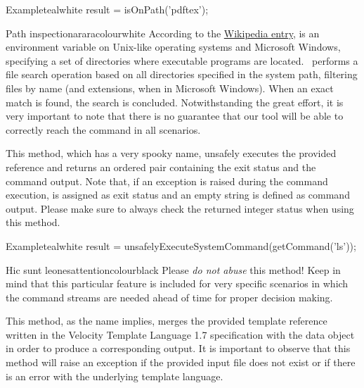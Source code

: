 \begin{description}
\begin{codebox}{Example}{teal}{\icnote}{white}
result = isOnPath('pdftex');
\end{codebox}

\begin{messagebox}{Path inspection}{araracolour}{\icok}{white}
According to the \href{https://en.wikipedia.org/wiki/PATH_(variable)}{Wikipedia entry},  is an environment variable on Unix-like operating systems and Microsoft Windows, specifying a set of directories where executable programs are located. \arara\ performs a file search operation based on all directories specified in the system path, filtering files by name (and extensions, when in Microsoft Windows). When an exact match is found, the search is concluded. Notwithstanding the great effort, it is very important to note that there is no guarantee that our tool will be able to correctly reach the command in all scenarios.
\end{messagebox}

\item[\mdbox{R}{unsafelyExecuteSystemCommand(Command command)}{Pair<Integer, String>}] This method, which has a very spooky name, unsafely executes the provided  reference and returns an ordered pair containing the exit status and the command output. Note that, if an exception is raised during the command execution,  is assigned as exit status and an empty string is defined as command output. Please make sure to always check the returned integer status when using this method.

\begin{codebox}{Example}{teal}{\icnote}{white}
result = unsafelyExecuteSystemCommand(getCommand('ls'));
\end{codebox}

\begin{messagebox}{Hic sunt leones}{attentioncolour}{\icattention}{black}
Please \emph{do not abuse} this method! Keep in mind that this particular feature is included for very specific scenarios in which the command streams are needed ahead of time for proper decision making.
\end{messagebox}

\item[\mdbox{R}{\parbox{0.62\textwidth}{mergeVelocityTemplate(File input, File output,\\\hspace*{1em} Map<String, Object> map)}}{void}] This method, as the name implies, merges the provided  template reference written in the Velocity Template Language 1.7 specification with the  data object in order to produce a corresponding  output. It is important to observe that this method will raise an exception if the provided input file does not exist or if there is an error with the underlying template language.


\end{description}
